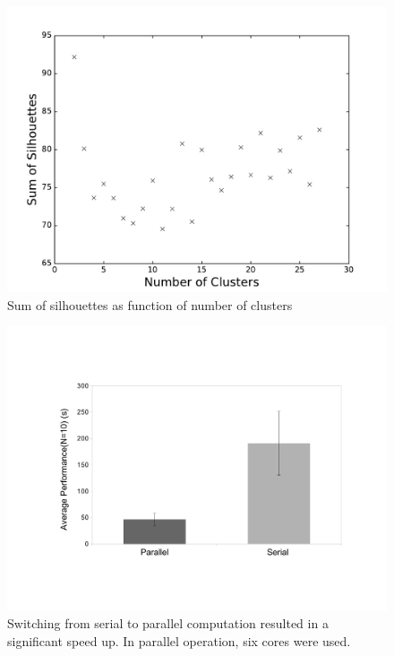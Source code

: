 \documentclass[fleqn,10pt]{wlscirep}
\begin{document}
\begin{figure}[ht]
                \centering
       \includegraphics[width=\linewidth]{figures/sumofsilhouettesasafunctionofclustersjustAgeSAPSavgHR}
       \caption{Sum of silhouettes as function of number of clusters}
       \label{fig:sumofsils}
\end{figure}
\begin{figure}[ht]
       \centering
       \includegraphics[width=\linewidth]{figures/runtimecomparison}
       \caption{Switching from serial to parallel computation resulted in a significant speed up. In parallel operation, six cores were used.}
        \label{fig:executiontime}
\end{figure}
\end{document}
